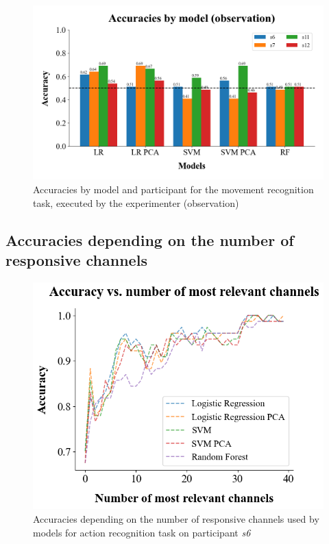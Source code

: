 \documentclass[10pt,conference,compsocconf]{IEEEtran}
\begin{document}
\begin{figure}[h!]
    \center
    \includegraphics[width=\linewidth]{../Code/figures/accuracies_across_part_obs.png}
    \caption{Accuracies by model and participant for the movement recognition task, executed by the experimenter (observation)}
    \label{appfig:accuracies_across_part_obs}
\end{figure}
\FloatBarrier

\subsection{Accuracies depending on the number of responsive channels}

\begin{figure}[h!]
    \center
    \includegraphics[width=\linewidth]{../Code/figures/s6_acc_vs_channels.png}
    \caption{Accuracies depending on the number of responsive channels used by models for action recognition task on participant \textit{s6}}
    \label{appfig:accuracies_ExObs_freq_bands_channels}
\end{figure}
\FloatBarrier
\end{document}
